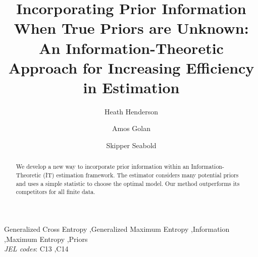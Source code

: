 \documentclass{elsarticle}
\begin{document}
\begin{frontmatter}

\title{Incorporating Prior Information When True Priors are Unknown: An 
Information-Theoretic Approach for Increasing Efficiency in Estimation}

\author[hh]{Heath Henderson}
\author[ag]{Amos Golan}
\author[ss]{Skipper Seabold}

\address[hh]{Department of Economics, Iowa State University}
\address[ag]{Info-Metrics Institute and Department of Economics, 
American University}
\address[ss]{Department of Economics, American University}

\begin{abstract}
We develop a new way to incorporate prior information within an Information-Theoretic (IT) 
estimation framework.
The estimator considers many potential priors and uses a simple statistic to choose the optimal 
model. 
Our method outperforms its competitors for all finite data. 
\end{abstract}

\begin{keyword}
Generalized Cross Entropy  \sep Generalized Maximum Entropy 
\sep Information \sep Maximum Entropy \sep Priors \\
\textit{JEL codes}: C13 \sep C14  
\end{keyword}

\end{frontmatter}

\doublespacing

\end{document}
